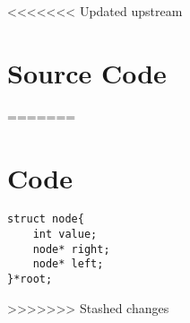<<<<<<< Updated upstream
\section{Source Code}
=======
\section{Code}

\begin{lstlisting}
struct node{
    int value;
    node* right;
    node* left;
}*root;
\end{lstlisting}
>>>>>>> Stashed changes
